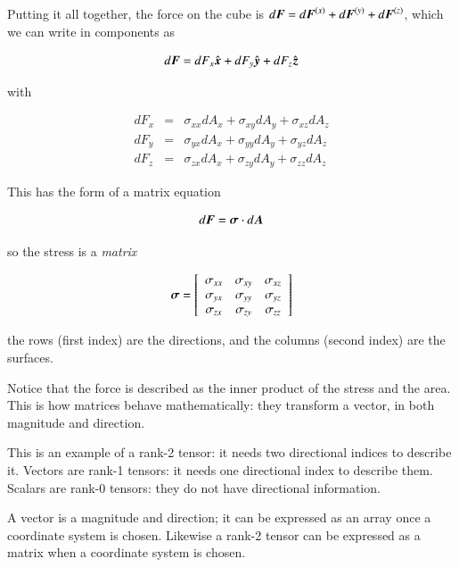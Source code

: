 Putting it all together, the force on the cube is  $d{\boldsymbol{F}} = d{\boldsymbol{F}}^{(x)} + d{\boldsymbol{F}}^{(y)} + d{\boldsymbol{F}}^{(z)}$, which we can write in components as  

\begin{equation}
d{\boldsymbol{F}} = dF_x \hat{{\boldsymbol{x}}} + dF_y \hat{{\boldsymbol{y}}} + dF_z \hat{{\boldsymbol{z}}}
\end{equation}

\noindent with 

\begin{eqnarray}
dF_x &=& \sigma_{xx}dA_x + \sigma_{xy}dA_y + \sigma_{xz}dA_z \\
dF_y &=& \sigma_{yx}dA_x + \sigma_{yy}dA_y + \sigma_{yz}dA_z \\
dF_z &=& \sigma_{zx}dA_x + \sigma_{zy}dA_y + \sigma_{zz}dA_z 
\end{eqnarray}

This has the form of a matrix equation  


\begin{equation}
d{\boldsymbol{F}} = \boldsymbol{\mathrm{\sigma}} \cdot d{\boldsymbol{A}}
\end{equation}


\noindent so the stress is a {\it matrix}


\begin{equation}
\boldsymbol{\mathrm{\sigma}} = \left[\begin{array}{ccc}
\sigma_{xx} & \sigma_{xy} & \sigma_{xz} \\
\sigma_{yx} & \sigma_{yy} & \sigma_{yz} \\
\sigma_{zx} & \sigma_{zy} & \sigma_{zz} 
\end{array}\right] 
\end{equation}


\noindent the rows (first index) are the directions, and the columns (second index) are the surfaces. 

Notice that the force is described as the inner product of the stress and the area. This is how matrices behave mathematically: they transform a vector, in both magnitude and direction. 

This is an example of a rank-2 tensor: it needs two directional indices to describe it. Vectors are rank-1 tensors: it needs one directional index to describe them. Scalars are rank-0 tensors: they do not have directional information. 

A vector is a magnitude and direction; it can be expressed as an array once a coordinate system is chosen. Likewise a rank-2 tensor can be expressed as a matrix when a coordinate system is chosen.


